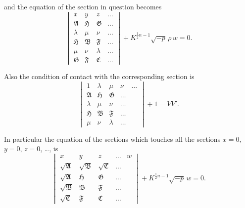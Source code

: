\documentclass[11pt]{article}
\begin{document}
\newpage
\setcounter{page}{85}

and the equation of the section in question becomes
\[
\begin{vmatrix}
x & y & z & \ldots \\
\mathfrak{A} & \mathfrak{H} & \mathfrak{G} & \ldots \\
\lambda & \mu & \nu & \ldots \\
\mathfrak{H} & \mathfrak{B} & \mathfrak{F} & \ldots \\
\mu & \nu & \lambda & \ldots \\
\mathfrak{G} & \mathfrak{F} & \mathfrak{C} & \ldots
\end{vmatrix}
+ K^{\frac{1}{2}n-1}\sqrt{-p}\,\rho\,w = 0.
\]

Also the condition of contact with the corresponding section is
\[
\begin{vmatrix}
1 & \lambda & \mu & \nu & \ldots \\
\mathfrak{A} & \mathfrak{H} & \mathfrak{G} & \ldots \\
\lambda & \mu & \nu & \ldots \\
\mathfrak{H} & \mathfrak{B} & \mathfrak{F} & \ldots \\
\mu & \nu & \lambda & \ldots
\end{vmatrix}
+ 1 = VV'.
\]

In particular the equation of the sections which touches all the sections $x=0$, $y=0$, $z=0$, \ldots, is
\[
\begin{vmatrix}
x & y & z & \ldots & w \\
\sqrt{\mathfrak{A}} & \sqrt{\mathfrak{B}} & \sqrt{\mathfrak{C}} & \ldots \\
\sqrt{\mathfrak{A}} & \mathfrak{H} & \mathfrak{G} & \ldots \\
\sqrt{\mathfrak{B}} & \mathfrak{B} & \mathfrak{F} & \ldots \\
\sqrt{\mathfrak{C}} & \mathfrak{F} & \mathfrak{C} & \ldots
\end{vmatrix}
+ K^{\frac{1}{2}n-1}\sqrt{-p}\,w = 0.
\]
\end{document}
